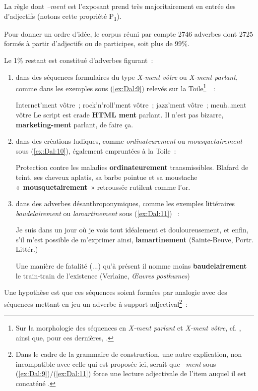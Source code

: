 \documentclass[output=paper]{langsci/langscibook}
\begin{document}

La règle dont \emph{--ment} est l'exposant prend très majoritairement en entrée des d'adjectifs (notons cette propriété P\textsubscript{1}).

Pour donner un ordre d'idée, le corpus réuni par %
\citet{Pagliano03} %
%
compte 2746 adverbes dont 2725 formés à partir d'adjectifs ou de participes, soit plus de 99\%.

Le 1\% restant est constitué d'adverbes figurant~:

\begin{enumerate}[label=(\roman*)]
\item dans des séquences formulaires du type \emph{X-ment vôtre} ou \emph{X-ment parlant}, comme dans les exemples sous (\ref{ex:Dal:9}) relevés sur la Toile\footnote{Sur la morphologie des séquences en \emph{X-ment parlant} et \emph{X-ment vôtre}, cf. %
\citet{Boye15}%
%
, ainsi que, pour ces dernières, %
\citet{Mora07}%
%
.}~\emph{~}:

\ea\label{ex:Dal:9}
    \ea\label{ex:Dal:9a} Internet'ment vôtre~; rock'n'roll'ment vôtre~; jazz'ment vôtre~; meuh..ment vôtre
    \ex\label{ex:Dal:9b} Le script est crade \textbf{HTML ment} parlant.
    \ex\label{ex:Dal:9c} Il n'est pas bizarre,  \textbf{marketing-ment} parlant, de faire ça.~
\z\z

\item dans des créations ludiques, comme \emph{ordinateurement} ou \emph{mousquetairement} sous (\ref{ex:Dal:10}), également empruntées à la Toile~:

\ea\label{ex:Dal:10}
    \ea\label{ex:Dal:10a} Protection contre les maladies \textbf{ordinateurement} transmissibles.
    \ex\label{ex:Dal:10b} Blafard de teint, ses cheveux aplatis, sa barbe pointue et sa moustache «~\textbf{mousquetairement}~» retroussée rutilent comme l'or.
\z\z

\newpage 
\item dans des adverbes désanthroponymiques, comme les exemples littéraires \emph{baudelairement} ou \emph{lamartinement} sous (\ref{ex:Dal:11}) %
\citep[cf.][]{Amiot05}%
%
~:

\ea\label{ex:Dal:11}
    \ea Je suis dans un jour où je vois tout idéalement et douloureusement, et enfin, s'il m'est possible de m'exprimer ainsi, \textbf{lamartinement} (Sainte-Beuve, Portr. Littér.)

    \ex Une manière de fatalité (...) qu'à présent il nomme moins \textbf{baudelairement} le train-train de l'existence (Verlaine, \emph{Œuvres posthumes})
\z\z
\end{enumerate}
Une hypothèse est que ces séquences soient formées par analogie %
\citep[cf.][]{Dal2003a} %
%
avec des séquences mettant en jeu un adverbe à support adjectival\footnote{Dans le cadre de la grammaire de construction, une autre explication, non incompatible avec celle qui est proposée ici, serait que \emph{--ment} sous (\ref{ex:Dal:9})/(\ref{ex:Dal:11}) force une lecture adjectivale de l'item auquel il est concaténé %
\citep[cf.][]{audringbooij16}%
%
.}~:
\end{document}
